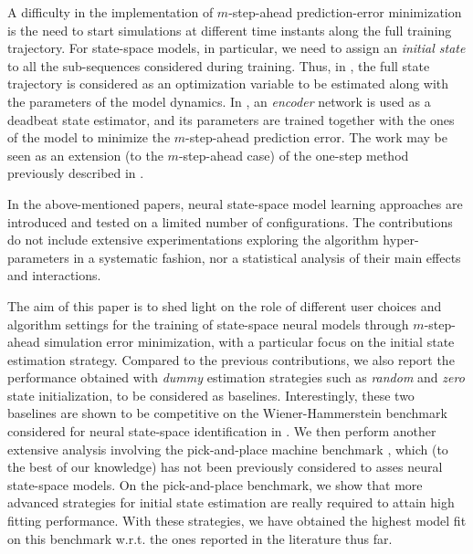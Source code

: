 \documentclass{article}
\newcommand{\seqlen}{m}
\begin{document}
A difficulty in the implementation of $\seqlen$-step-ahead prediction-error minimization is the need to start simulations at different time instants along the full training trajectory.
For state-space models, in particular, we need to assign an \emph{initial state} to all the sub-sequences considered during training. Thus,
in \cite{forgione2020model}, the full state trajectory is considered as an optimization variable to be estimated along with the parameters of the model dynamics.
In \cite{beintema2021nonlinear}, an \emph{encoder} network is used as a deadbeat state estimator, and its parameters are trained together with the ones of the model to minimize the $m$-step-ahead prediction error. The work may be seen as an extension (to the $m$-step-ahead case) of the one-step method previously described in \cite{masti2018learning}.

In the above-mentioned papers, neural state-space model learning approaches are introduced and tested on a limited number of configurations. The contributions do not include extensive experimentations exploring the algorithm hyper-parameters in a systematic fashion, nor a statistical analysis of their main effects and interactions.


The aim of this paper is to shed light on the role of different user choices and algorithm settings for the training of state-space neural models through $m$-step-ahead simulation error minimization, with a particular focus on the initial state estimation strategy.
Compared to the previous contributions, we also report the performance obtained with \emph{dummy} estimation strategies such as \emph{random} and \emph{zero} state initialization, to be considered as baselines. Interestingly, these two baselines are shown to be competitive on the Wiener-Hammerstein benchmark \cite{ljung2009wiener} considered for neural state-space identification in \cite{beintema2021nonlinear}. We then perform another extensive analysis involving the pick-and-place machine benchmark \cite{juloski2004pickplace}, which (to the best of our knowledge) has not been previously considered to asses neural state-space models. On the pick-and-place benchmark, we show that more advanced strategies for initial state estimation are really required to attain high fitting performance. With these strategies, we have obtained the highest model fit on this benchmark w.r.t.  the ones reported in the literature thus far. 
\end{document}
